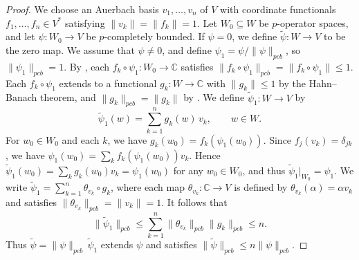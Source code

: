\documentclass[12pt]{article}
\newcommand{\pcb}{pcb}
\begin{document}
\begin{proof}
We choose an Auerbach basis $v_1,\ldots,v_n$ of $V$ with coordinate functionals
$f_1,\ldots,f_n\in V^*$ satisfying $\|v_k\|=\|f_k\|=1$.  Let $W_0\subseteq W$ be $p$-operator spaces, and let $\psi:W_0\to V$ be $p$-completely bounded.
If $\psi=0$, we define $\widetilde\psi:W\to V$ to be the zero map.
We assume that $\psi\neq 0$, and define $\psi_1=\psi/\|\psi\|_{\pcb}$, so $\|\psi_1\|_{\pcb}=1$.
By \cite[Lemma~4.2]{Daws2007}, each
$f_k\circ\psi_1:W_0\to\mathbb C$ satisfies
$\|f_k\circ\psi_1\|_{\pcb}=\|f_k\circ\psi_1\|\leq 1$.
Each $f_k\circ\psi_1$ extends to a functional $g_k:W\to\mathbb C$ with
$\|g_k\|\leq 1$ by the Hahn--Banach theorem, and
$\|g_k\|_{\pcb}=\|g_k\|$ by \cite[Lemma~4.2]{Daws2007}.  We define
$\widetilde\psi_1:W\to V$ by
\[
        \widetilde\psi_1(w)=\sum_{k=1}^n g_k(w)\,v_k,\qquad w\in W.
\]
For $w_0\in W_0$ and each $k$, we have $g_k(w_0)=f_k(\psi_1(w_0))$.  Since
$f_j(v_k)=\delta_{jk}$, we have $\psi_1(w_0)=\sum_k f_k(\psi_1(w_0))v_k$.
Hence $\widetilde\psi_1(w_0)=\sum_k g_k(w_0)v_k=\psi_1(w_0)$ for any
$w_0\in W_0$, and thus $\widetilde\psi_1|_{W_0}=\psi_1$.
We write $\widetilde\psi_1=\sum_{k=1}^n \theta_{v_k}\circ g_k$, where each map
$\theta_{v_k}:\mathbb{C}\to V$ is defined by $\theta_{v_k}(\alpha)=\alpha v_k$ and satisfies
$\|\theta_{v_k}\|_{\pcb}=\|v_k\|=1$. It follows that
\[
        \|\widetilde\psi_1\|_{\pcb}\leq
        \sum_{k=1}^n\|\theta_{v_k}\|_{\pcb}\|g_k\|_{\pcb}\leq n.
\]
Thus $\widetilde\psi=\|\psi\|_{\pcb}\,\widetilde\psi_1$ extends $\psi$ and satisfies
$\|\widetilde\psi\|_{\pcb}\leq n\|\psi\|_{\pcb}$.
\end{proof}
\end{document}
